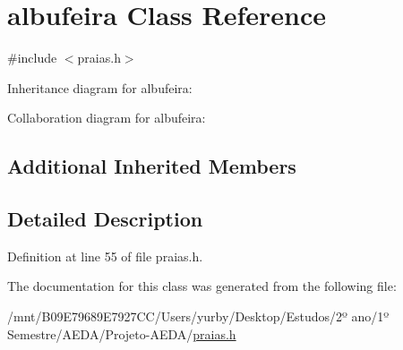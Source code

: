 \hypertarget{classalbufeira}{}\section{albufeira Class Reference}
\label{classalbufeira}


{\ttfamily \#include $<$praias.\+h$>$}



Inheritance diagram for albufeira\+:


Collaboration diagram for albufeira\+:
\subsection*{Additional Inherited Members}


\subsection{Detailed Description}


Definition at line 55 of file praias.\+h.



The documentation for this class was generated from the following file\+:\begin{DoxyCompactItemize}
\item 
/mnt/\+B09\+E79689\+E7927\+C\+C/\+Users/yurby/\+Desktop/\+Estudos/2º ano/1º Semestre/\+A\+E\+D\+A/\+Projeto-\/\+A\+E\+D\+A/\hyperlink{praias_8h}{praias.\+h}\end{DoxyCompactItemize}
